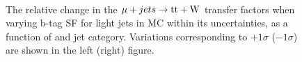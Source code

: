 \begin{figure}[!h]
  \centering
   ~~
  \\

  \caption{\label{fig:tfSyst_bsfl_muToTtw} The relative change in the $\mu + jets \rightarrow \mathrm{tt+W}$ transfer
  factors when varying b-tag SF for light jets in MC within its uncertainties, as a function of \scalht and jet category. 
  Variations corresponding to $+1\sigma$ ($-1\sigma$) are shown in the left (right) figure. 
  }
\end{figure}




